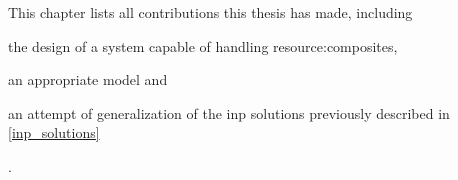 This chapter lists all contributions this thesis has made, including
\begin{mylist}
    \item the design of a system capable of handling \glspl{resource:composite},
    \item an appropriate \gls{model} and
    \item an attempt of generalization of the \gls{inp} solutions previously described in \autoref{inp_solutions}
\end{mylist}.